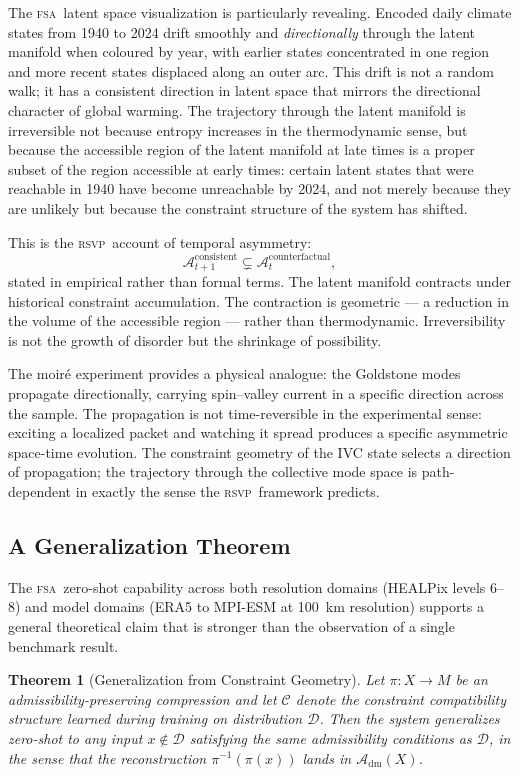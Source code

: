 \documentclass[11pt,a4paper]{article}
\theoremstyle{plain}
\newtheorem{theorem}{Theorem}[section]
\theoremstyle{definition}
\theoremstyle{remark}
\newcommand{\A}{\mathcal{A}}
\newcommand{\Adm}{\mathcal{A}_{\mathrm{dm}}}
\newcommand{\RSVP}{\textup{\textsc{rsvp}}}
\newcommand{\FSA}{\textup{\textsc{fsa}}}
\begin{document}
The \FSA\ latent space visualization is particularly revealing. Encoded
daily climate states from 1940 to 2024 drift smoothly and \textit{directionally}
through the latent manifold when coloured by year, with earlier states
concentrated in one region and more recent states displaced along an
outer arc. This drift is not a random walk; it has a consistent direction
in latent space that mirrors the directional character of global warming.
The trajectory through the latent manifold is irreversible not because
entropy increases in the thermodynamic sense, but because the accessible
region of the latent manifold at late times is a proper subset of the region
accessible at early times: certain latent states that were reachable in 1940
have become unreachable by 2024, and not merely because they are unlikely
but because the constraint structure of the system has shifted.

This is the \RSVP\ account of temporal asymmetry:
\[
\A_{t+1}^{\mathrm{consistent}} \subsetneq \A_t^{\mathrm{counterfactual}},
\]
stated in empirical rather than formal terms. The latent manifold contracts
under historical constraint accumulation. The contraction is geometric ---
a reduction in the volume of the accessible region --- rather than
thermodynamic. Irreversibility is not the growth of disorder but the
shrinkage of possibility.

The moiré experiment provides a physical analogue: the Goldstone modes
propagate directionally, carrying spin--valley current in a specific direction
across the sample. The propagation is not time-reversible in the
experimental sense: exciting a localized packet and watching it spread
produces a specific asymmetric space-time evolution. The constraint geometry
of the IVC state selects a direction of propagation; the trajectory through
the collective mode space is path-dependent in exactly the sense the \RSVP\
framework predicts.

\subsection{A Generalization Theorem}

The \FSA\ zero-shot capability across both resolution domains (HEALPix
levels 6--8) and model domains (ERA5 to MPI-ESM at 100~km resolution)
supports a general theoretical claim that is stronger than the observation
of a single benchmark result.

\begin{theorem}[Generalization from Constraint Geometry]
\label{thm:gen}
Let $\pi: X \to M$ be an admissibility-preserving compression and let
$\mathcal{C}$ denote the constraint compatibility structure learned during
training on distribution $\mathcal{D}$. Then the system generalizes
zero-shot to any input $x \notin \mathcal{D}$ satisfying the same
admissibility conditions as $\mathcal{D}$, in the sense that the
reconstruction $\pi^{-1}(\pi(x))$ lands in $\Adm(X)$.
\end{theorem}
\end{document}

